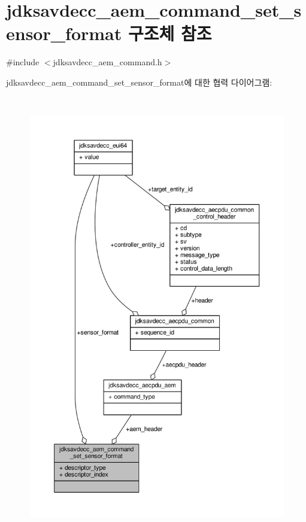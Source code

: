 \hypertarget{structjdksavdecc__aem__command__set__sensor__format}{}\section{jdksavdecc\+\_\+aem\+\_\+command\+\_\+set\+\_\+sensor\+\_\+format 구조체 참조}
\label{structjdksavdecc__aem__command__set__sensor__format}


{\ttfamily \#include $<$jdksavdecc\+\_\+aem\+\_\+command.\+h$>$}



jdksavdecc\+\_\+aem\+\_\+command\+\_\+set\+\_\+sensor\+\_\+format에 대한 협력 다이어그램\+:
\nopagebreak
\begin{figure}[H]
\begin{center}
\leavevmode
\includegraphics[height=550pt]{structjdksavdecc__aem__command__set__sensor__format__coll__graph}
\end{center}
\end{figure}
